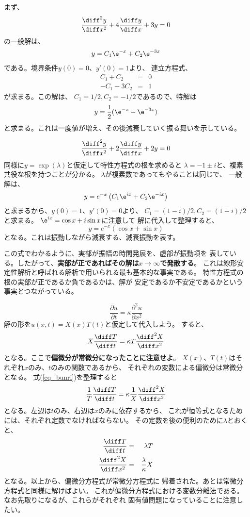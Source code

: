 まず、
$$\frac{\diff^2 y}{\diff x^2} + 4 \frac{\diff y}{\diff x} + 3y = 0$$
の一般解は、
$$
  y = C_1 \e^{-x} + C_2 \e^{-3x}
$$
である。境界条件$y(0) = 0$、$y'(0) = 1$より、
連立方程式、
\begin{eqnarray}
  C_1 + C_2 &=& 0 \\
  -C_1 -3 C_2 &=& 1
\end{eqnarray}
が求まる。この解は、
$C_1 = 1/2, C_2 = - 1/2$であるので、特解は
$$
  y = \frac{1}{2}(\e^{-x} - \e^{-3x})
$$
と求まる。これは一度値が増え、その後減衰していく振る舞いを示している。

$$
  \frac{\diff^2 y}{\diff x^2} + 2 \frac{\diff y}{\diff x} + 2y = 0
$$
同様に$y = \exp(\lambda)$と仮定して特性方程式の根を求めると
$\lambda = -1 \pm i$と、複素共役な根を持つことが分かる。
$\lambda$が複素数であってもやることは同じで、
一般解は、
$$
  y = e^{-x} \left(C_1 \e^{ix} + C_2 \e^{-ix} \right)
$$
と求まるから、$y(0) = 1$、$y'(0) = 0$より、
$C_1 = (1-i)/2, C_2 = (1+i)/2$と求まる。
$\e^{ix} = \cos x + i \sin x$に注意して
解に代入して整理すると、
$$
  y = e^{-x} \left( \cos x + \sin x \right)
$$
となる。これは振動しながら減衰する、減衰振動を表す。

この式でわかるように、実部が振幅の時間発展を、虚部が振動項を
表している。したがって、{\bf 実部が正であればその解は$x \rightarrow \infty$で発散する}。
これは線形安定性解析と呼ばれる解析で用いられる最も基本的な事実である。
特性方程式の根の実部が正であるか負であるかは、解が
安定であるか不安定であるかという事実とつながっている。

$$ \frac{\partial u}{\partial t} =  \kappa \frac{\partial^2 u}{\partial x^2} $$
解の形を$u(x,t) = X(x)T(t)$と仮定して代入しよう。
すると、
\begin{equation}
  X \frac{\diff T}{\diff t} = \kappa T \frac{\diff^2 X}{\diff x^2}
  \label{eq_bunri}
\end{equation}
となる。ここで{\bf 偏微分が常微分になったことに注意せよ}。
$X(x)$、$T(t)$はそれぞれ$x$のみ、$t$のみの関数であるから、
それぞれの変数による偏微分は常微分となる。
式(\ref{eq_bunri})を整理すると
\begin{equation}
  \frac{1}{T} \frac{\diff T}{\diff t} = \kappa  \frac{1}{X} \frac{\diff^2 X}{\diff x^2}
\end{equation}
となる。左辺は$t$のみ、右辺は$x$のみに依存するから、
これが恒等式となるためには、それぞれ定数でなければならない。
その定数を後の便利のために$\lambda$とおくと、
\begin{eqnarray}
  \frac{\diff T}{\diff t} &= & \lambda T \label{eq_lambda} \\
  \frac{\diff^2 X}{\diff x^2} &= & \frac{\lambda}{\kappa} X
\end{eqnarray}
となる。以上から、偏微分方程式が常微分方程式に
帰着された。あとは常微分方程式と同様に解けばよい。
これが偏微分方程式における変数分離法である。
なお先取りになるが、これらがそれぞれ
固有値問題になっていることに注意したい。

